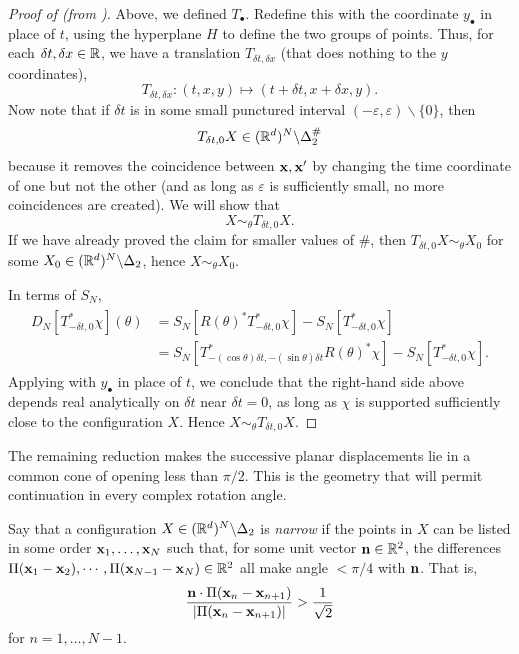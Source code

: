 \begin{proof}[Proof of  (from )]
    
    Above, we defined $T_\bullet$. Redefine this with the coordinate $y_\bullet$ in place of $t$, using the hyperplane $H$ to define the two groups of points. Thus, for each $\delta t,\delta x\in \mathbb{R}$, we have a translation $T_{\delta t,\delta x}$ (that does nothing to the $y$ coordinates), 
    \begin{equation}
        T_{\delta t,\delta x}:(t,x,y)\mapsto (t+\delta t,x+\delta x,y).
    \end{equation}
    Now note that if $\delta t$ is in some small punctured interval $(-\varepsilon,\varepsilon)\backslash \{0\}$, then 
    \begin{equation}
        T_{\delta t,0} X  \in (\mathbb{R}^d)^N\backslash \Delta_2^\# 
    \end{equation}
    because it removes the coincidence between $\mathbf{x},\mathbf{x}'$ by changing the time coordinate of one but not the other (and as long as $\varepsilon$ is sufficiently small, no more coincidences are created). We will show that 
    \begin{equation}
        X\sim_\theta T_{\delta t,0} X .
    \end{equation}
    If we have already proved the claim for smaller values of $\#$, then $T_{\delta t,0} X\sim_\theta X_0$ for some $X_0\in (\mathbb{R}^d)^N\backslash \Delta_2$, hence $X\sim_\theta X_0$. 

     In terms of $S_N$, 
    \begin{align}
    \begin{split} 
        D_N[T_{-\delta t,0}^* \chi ](\theta) &= S_N[R(\theta)^* T_{-\delta t,0}^* \chi] - S_N[T_{-\delta t,0}^* \chi] \\
        &= S_N[T_{-(\cos \theta )\delta t, -(\sin \theta)\delta t}^* R(\theta)^*  \chi] - S_N[T_{-\delta t,0}^* \chi].
        \end{split} 
    \end{align}
    Applying  with $y_\bullet$ in place of $t$, we conclude that the right-hand side above depends real analytically on $\delta t$ near $\delta t=0$, as long as $\chi$ is supported sufficiently close to the configuration $X$. Hence $X\sim_\theta T_{\delta t,0} X$.
\end{proof}

The remaining reduction makes the successive planar displacements lie
in a common cone of opening less than $\pi/2$. This is the geometry
that will permit continuation in every complex rotation angle.


Say that a configuration $X \in (\mathbb{R}^d)^N\backslash \Delta_2$ is \emph{narrow} if the points in $X$ can be listed in some order $\mathbf{x}_1,\dots,\mathbf{x}_N$ such that, for some unit vector $\mathbf{n}\in \mathbb{R}^2$, the differences $\Pi(\mathbf{x}_{1} - \mathbf{x}_{2}),\cdots , \Pi(\mathbf{x}_{N-1}-\mathbf{x}_N)\in \mathbb{R}^2$ all make angle $<\pi/4$ with $\mathbf{n}$. That is, 
\begin{equation}
    \frac{\mathbf{n} \cdot \Pi (\mathbf{x}_{n} - \mathbf{x}_{n+1} )}{|\Pi(\mathbf{x}_{n} - \mathbf{x}_{n+1})|} > \frac{1}{\sqrt{2}}
\end{equation}
for $n=1,\dots,N-1$. 

